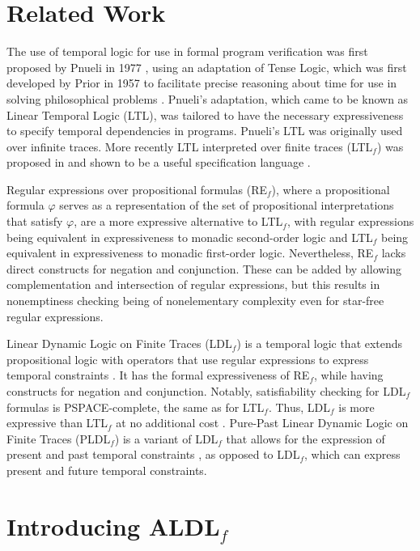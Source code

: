 \documentclass[10pt,a4paper]{amsart}
\theoremstyle{plain}
\theoremstyle{definition}
\theoremstyle{definition}
\DeclareMathOperator{\?}{?}
\begin{document}
\section{Related Work}
\label{ch:relatedwork}
The use of temporal logic for use in formal program verification was first proposed by Pnueli in 1977 \cite{pnueli77}, using an adaptation of Tense Logic, which was first developed by Prior in 1957 to facilitate precise reasoning about time for use in solving philosophical problems \cite{prior57}. Pnueli's adaptation, which came to be known as Linear Temporal Logic (LTL), was tailored to have the necessary expressiveness to specify temporal dependencies in programs. Pnueli's LTL was originally used over infinite traces. More recently LTL interpreted over finite traces (LTL$_f$) was proposed in \cite{ldlf} and shown to be a useful specification language \cite{aalst,bienvenu,gabaldon,pevsic,wilke}.

Regular expressions over propositional formulas (RE$_f$), where a propositional formula $\varphi$ serves as a representation of the set of propositional interpretations that satisfy $\varphi$, are a more expressive alternative to LTL$_f$, with regular expressions being equivalent in expressiveness to monadic second-order logic and LTL$_f$ being equivalent in expressiveness to monadic first-order logic. Nevertheless, RE$_f$ lacks direct constructs for negation and conjunction. These can be added by allowing complementation and intersection of regular expressions, but this results in nonemptiness checking being of nonelementary complexity even for star-free regular expressions.

Linear Dynamic Logic on Finite Traces (LDL$_f$) is a temporal logic that extends propositional logic with operators that use regular expressions to express temporal constraints \cite{ldlf}. It has the formal expressiveness of RE$_f$, while having constructs for negation and conjunction. Notably, satisfiability checking for LDL$_f$ formulas is PSPACE-complete, the same as for LTL$_f$. Thus, LDL$_f$ is more expressive than LTL$_f$ at no additional cost \cite{ldlf}. Pure-Past Linear Dynamic Logic on Finite Traces (PLDL$_f$) is a variant of LDL$_f$ that allows for the expression of present and past temporal constraints \cite{pldlf}, as opposed to LDL$_f$, which can express present and future temporal constraints.

\section{\texorpdfstring{Introducing ALDL$_f$}{Introducing ALDLf}}
\end{document}
